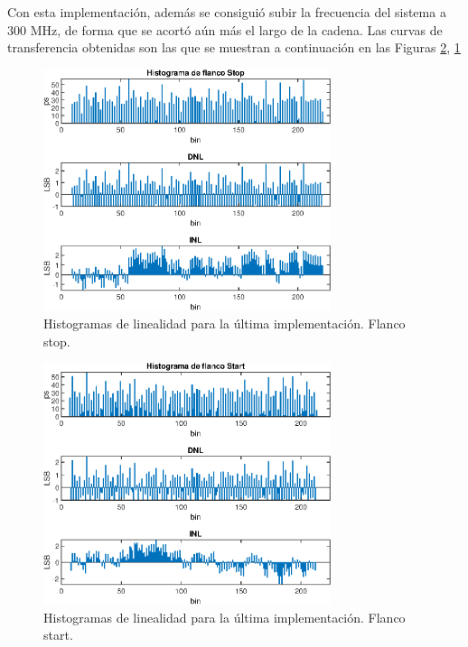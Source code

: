  Con esta implementación, además se consiguió subir la frecuencia del sistema a $300$ MHz, de forma que se acortó 
 aún más el largo de la cadena. Las curvas de transferencia obtenidas son las que se muestran a continuación 
 en las Figuras \ref{fig: transferencia_start_med5}, \ref{fig: transferencia_stop_med5}

 \begin{figure}[H]
      \centering
      \includegraphics[width=0.75\textwidth]{imagenes/linealidad_stop_med5.eps}
      \caption{Histogramas de linealidad para la última implementación. Flanco stop.}
      \label{fig: transferencia_stop_med5}
 \end{figure}
 \begin{figure}[H]
     \centering
     \includegraphics[width=0.75\textwidth]{imagenes/linealidad_start_med5.eps}
     \caption{Histogramas de linealidad para la última implementación. Flanco start.}
     \label{fig: transferencia_start_med5}
\end{figure}

